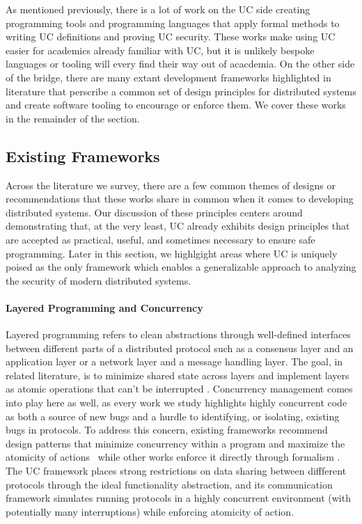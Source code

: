 As mentioned previously, there is a lot of work on the UC side creating programming tools and programming languages that apply formal methods to writing UC definitions and proving UC security.
These works make using UC easier for academics already familiar with UC, but it is unlikely bespoke languages or tooling will every find their way out of acacdemia.
On the other side of the bridge, there are many extant development frameworks highlighted in literature that perscribe a common set of design principles for distributed systems and create software tooling to encourage or enforce them.
We cover these works in the remainder of the section.

\subsection{Existing Frameworks}
Across the literature we survey, there are a few common themes of designs or recommendations that these works share in common when it comes to developing distributed systems.
Our discussion of these principles centers around demonstrating that, at the very least, UC already exhibits design principles that are accepted as practical, useful, and sometimes necessary to ensure safe programming.
Later in this section, we highlgight areas where UC is uniquely poised as the only framework which enables a generalizable approach to analyzing the security of modern distributed systems. 

\paragraph{Layered Programming and Concurrency}
Layered programming refers to clean abstractions through well-defined interfaces between different parts of a distributed protocol such as a consensus layer and an application layer or a network layer and a message handling layer.
The goal, in related literature, is to minimize shared state across layers and implement layers as atomic operations that can't be interrupted \cite{killian2007mace, bolosky2007farsite}.
Concurrency management comes into play here as well, as every work we study highlights highly concurrent code as both a source of new bugs and a hurdle to identifying, or isolating, existing bugs in protocols. 
To address this concern, existing frameworks recommend design patterns that minimize concurrency within a program and maximize the atomicity of actions~\cite{bolosky2007farsite} while other works enforce it directly through formalism \cite{killian2007mace, wilcox2015verdi}.
The UC framework places strong restrictions on data sharing between diffferent protocols through the ideal functionality abstraction, and its communication framework simulates running protocols in a highly concurrent environment (with potentially many interruptions) while enforcing atomicity of action.

